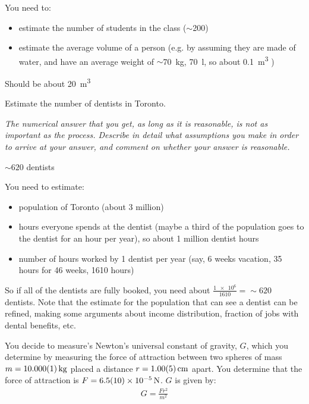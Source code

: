 \begin{solution}
You need to:
\begin{itemize}
\item estimate the number of students in the class ($\sim$200)
\item estimate the average volume of a person (e.g. by assuming they are made of water, and have an average weight of $\sim$\SI{70}{kg}, \SI{70}{l}, so about \SI{0.1}{m^3} )
\end{itemize}
Should be about \SI{20}{m^3}
\end{solution}

\question Estimate the number of dentists in Toronto.  

\textit{The numerical answer that you get, as long as it is reasonable, is not as important as the process. Describe in detail what assumptions you make in order to arrive at your answer, and comment on whether your answer is reasonable.}

\begin{finalanswer}
$\sim 620$ dentists 
\end{finalanswer}

\begin{solution}
You need to estimate:
\begin{itemize}
\item population of Toronto (about 3 million)
\item hours everyone spends at the dentist (maybe a third of the population goes to the dentist for an hour per year), so about 1 million dentist hours
\item number of hours worked by 1 dentist per year (say, 6 weeks vacation, 35 hours for 46 weeks, 1610 hours)
\end{itemize}
So if all of the dentists are fully booked, you need about $\frac{\num{1e6}}{1610}=\sim 620$ dentists. Note that the estimate for the population that can see a dentist can be refined, making some arguments about income distribution, fraction of jobs with dental benefits, etc. 
\end{solution}

\question You decide to measure's Newton's universal constant of gravity, $G$, which you determine by measuring the force of attraction between two spheres of mass $m=\SI{10.000\pm 0.001}{kg}$ placed a distance $r=\SI{1.00\pm0.05}{cm}$ apart. You determine that the force of attraction is $F=\SI{6.5 \pm 1.0e-5}{N}$. $G$ is given by:
\begin{align*}
G = \frac{Fr^2}{m^2}
\end{align*}

